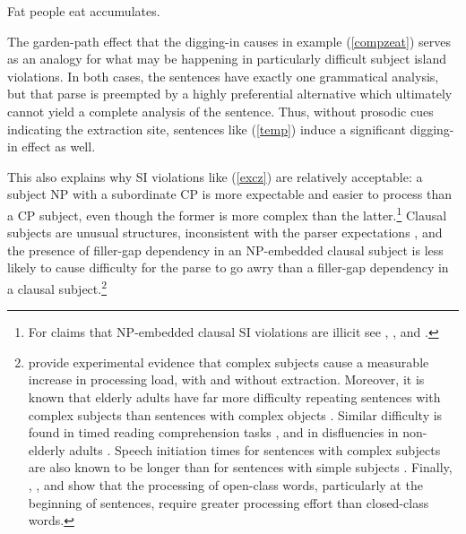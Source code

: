 \documentclass[output=paper,biblatex,babelshorthands,newtxmath,draftmode,colorlinks,citecolor=brown]{langscibook}
\begin{document}
\ea \label{compzeat} Fat people eat accumulates.
\z 

\noindent
The garden-path effect that the digging-in causes in example (\ref{compzeat}) serves as an analogy
for what may be happening in particularly difficult subject island violations.  In both cases, the
sentences have exactly one grammatical analysis, but that parse is preempted by a highly
preferential alternative which ultimately cannot yield a complete analysis of the sentence.  Thus,
without prosodic cues indicating the extraction site, sentences like (\ref{temp}) induce a
significant digging-in effect as well.


\eal \label{temp}
\zl

This also explains why SI violations like (\ref{excz}) are relatively acceptable: a subject NP with
a subordinate CP is more expectable and easier to process than a CP subject, even though the former
is more complex than the latter.\footnote{For claims that NP-embedded clausal SI violations are
  illicit see \citet[42]{lasniksaito}, \citet[796]{colinphillips}, and \citet[67]{colin_horn}.}
Clausal subjects are unusual structures, inconsistent with the parser expectations \citep{fod74},
and the presence of filler-gap dependency in an NP-embedded clausal subject is less likely to cause
difficulty for the parse to go awry than a filler-gap dependency in a clausal
subject.\footnote{\citet{clausen,clausencuny} provide experimental evidence that complex subjects
  cause a measurable increase in processing load, with and without extraction. Moreover, it is known
  that elderly adults have far more difficulty repeating sentences with complex subjects than
  sentences with complex objects \citep{kemper86}. Similar difficulty is found in timed reading
  comprehension tasks \citep{kynette}, and in disfluencies in non-elderly adults \citep{clarkwasow}.
  Speech initiation times for sentences with complex subjects are also known to be longer than for
  sentences with simple subjects \citep{ferreirasubj,tsiam}.  Finally, \citet{garnsey},
  \citet{kutasetal}, and \citet{vanpetten} show that the processing of open-class words,
  particularly at the beginning of sentences, require greater processing effort than closed-class
  words.}
\end{document}
